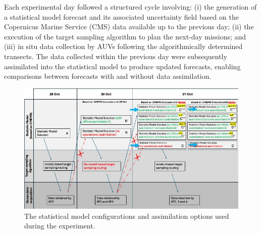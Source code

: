 
Each experimental day followed a structured cycle involving: (i) the
generation of a statistical model forecast and its associated
uncertainty field based on the Copernicus Marine Service (CMS)
\cite{sotillo2021} data available up to the previous day; (ii) the
execution of the target sampling algorithm to plan the next-day
missions; and (iii) in situ data collection by AUVs following the
algorithmically determined transects. The data collected within the
previous day were subsequently assimilated into the statistical model
to produce updated forecasts, enabling comparisons between forecasts
with and without data assimilation.


\begin{figure}
    \centering
    \includegraphics[scale=0.6]{fig/model-config.jpeg}
    \caption{The statistical model configurations and assimilation
      options used during the \proj experiment.}
    \label{fig:model-config}
\end{figure}


